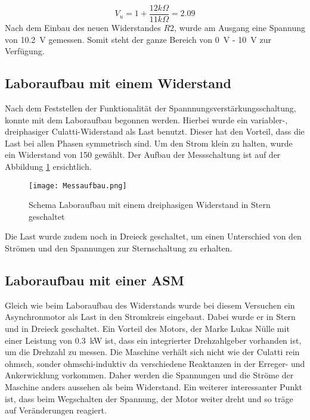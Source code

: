 \begin{equation}
V_u = 1 + \frac{12k\Omega}{11k\Omega} = 2.09
\end{equation}
Nach dem Einbau des neuen Widerstandes $R2$, wurde am Ausgang  eine Spannung von \SI{10.2}{V} gemessen. Somit steht der ganze Bereich von \SI{0}{V} - \SI{10}{V} zur Verfügung.

\subsection{Laboraufbau mit einem Widerstand}
Nach dem Feststellen der Funktionalität der Spannnungsverstärkungsschaltung, konnte mit dem Laboraufbau begonnen werden. Hierbei wurde ein variabler-, dreiphasiger Culatti-Widerstand als Last benutzt. Dieser hat den Vorteil, dass die Last bei allen Phasen symmetrisch sind. Um den Strom klein zu halten, wurde ein Widerstand von \SI{150}{\Omega} gewählt. Der Aufbau der Messschaltung ist auf der Abbildung \ref{fig:Messaufbau} ersichtlich.


\begin{figure}[ht!]
	\centering
	\texttt{[image: Messaufbau.png]}	
	\caption{Schema Laboraufbau mit einem dreiphasigen Widerstand in Stern geschaltet}\label{fig:Messaufbau}
\end{figure}

Die Last wurde zudem noch in Dreieck geschaltet, um einen Unterschied von den Strömen und den Spannungen zur Sternschaltung zu erhalten.

\subsection{Laboraufbau mit einer ASM}

Gleich wie beim Laboraufbau des Widerstands wurde bei diesem Versuchen ein Asynchronmotor als Last in den Stromkreis eingebaut. Dabei wurde er in Stern und in Dreieck geschaltet. Ein Vorteil des Motors, der Marke Lukas Nülle mit einer Leistung von \SI{0.3}{kW} ist, dass ein integrierter Drehzahlgeber vorhanden ist, um die Drehzahl zu messen. Die Maschine verhält sich nicht wie der Culatti rein ohmsch, sonder ohmschi-induktiv da verschiedene Reaktanzen in der Erreger- und Ankerwicklung vorkommen. Daher werden die Spannungen und die Ströme der Maschine anders aussehen als beim Widerstand. Ein weiterer interessanter Punkt ist, dass beim Wegschalten der Spannung, der Motor weiter dreht und so träge auf Veränderungen reagiert.  



